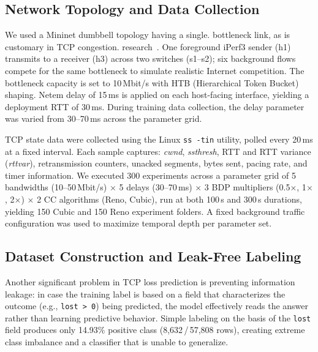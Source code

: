 \documentclass[journal]{IEEEtran}
\begin{document}
\subsection{Network Topology and Data Collection}

We used a Mininet dumbbell topology having a single.
bottleneck link, as is customary in TCP congestion.
research~\cite{welzl2024}. One foreground iPerf3 sender (h1) transmits to a receiver (h3) across two switches (s1--s2); six background flows compete for the same bottleneck to simulate realistic Internet competition. The bottleneck capacity is set to 10\,Mbit/s with HTB (Hierarchical Token Bucket) shaping. Netem delay of 15\,ms is applied on each host-facing interface, yielding a deployment RTT of 30\,ms. During training data collection, the delay parameter was varied from 30--70\,ms across the parameter grid.

TCP state data were collected using the Linux \texttt{ss -tin} utility, polled every 20\,ms at a fixed interval. Each sample captures: \emph{cwnd}, \emph{ssthresh}, RTT and RTT variance (\emph{rttvar}), retransmission counters, unacked segments, bytes sent, pacing rate, and timer information. We executed 300 experiments across a parameter grid of 5 bandwidths (10--50\,Mbit/s) $\times$ 5 delays (30--70\,ms) $\times$ 3 BDP multipliers (0.5$\times$, 1$\times$, 2$\times$) $\times$ 2 CC algorithms (Reno, Cubic), run at both 100\,s and 300\,s durations, yielding 150 Cubic and 150 Reno experiment folders. A fixed background traffic configuration was used to maximize temporal depth per parameter set.

\subsection{Dataset Construction and Leak-Free Labeling}

Another significant problem in TCP loss prediction is preventing information leakage: in case the training label is based on a field that characterizes the outcome (e.g., \texttt{lost\,>\,0}) being predicted, the model effectively reads the answer rather than learning predictive behavior. Simple labeling on the basis of the \texttt{lost} field produces only 14.93\% positive class (8,632\,/\,57,808 rows), creating extreme class imbalance and a classifier that is unable to generalize.
\end{document}
